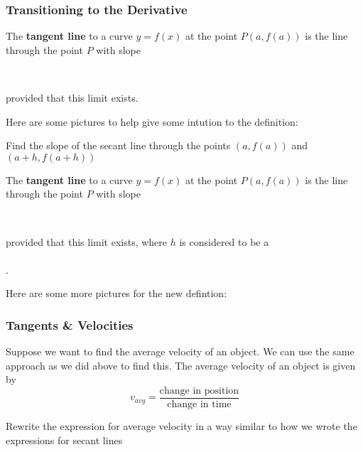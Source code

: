 \documentclass[notes]{subfiles}
\begin{document}
	\subsubsection*{Transitioning to the Derivative}
	
		\begin{defn}
			The \textbf{tangent line} to a curve \(y = f(x)\) at the point \(P(a,f(a))\) is the line through the point \(P\) with slope
			
				\\ \vspace{.75in}
			
			provided that this limit exists.
		\end{defn}
		Here are some pictures to help give some intution to the definition:

			\vspace{2in}
			
		\begin{ex}
			Find the slope of the secant line through the points \((a,f(a))\) and \((a+h,f(a+h))\)
		\end{ex}
			\newpage
			
		\begin{defn}
			The \textbf{tangent line} to a curve \(y = f(x)\) at the point \(P(a,f(a))\) is the line through the point \(P\) with slope
			
				\\ \vspace{.75in}
			
			provided that this limit exists, where \(h\) is considered to be a \\ \\[5pt]
			
				.
			
		\end{defn}
		Here are some more pictures for the new defintion:
			
	\subsubsection*{Tangents \& Velocities}
		
		Suppose we want to find the average velocity of an object.  We can use the same approach as we did above to find this.  The average velocity of an object is given by
			\[v_{avg} = \dfrac{\text{change in position}}{\text{change in time}}\]
			
		\begin{ex}
			Rewrite the expression for average velocity in a way similar to how we wrote the expressions for secant lines
		\end{ex}
			\newpage
		
\end{document}
